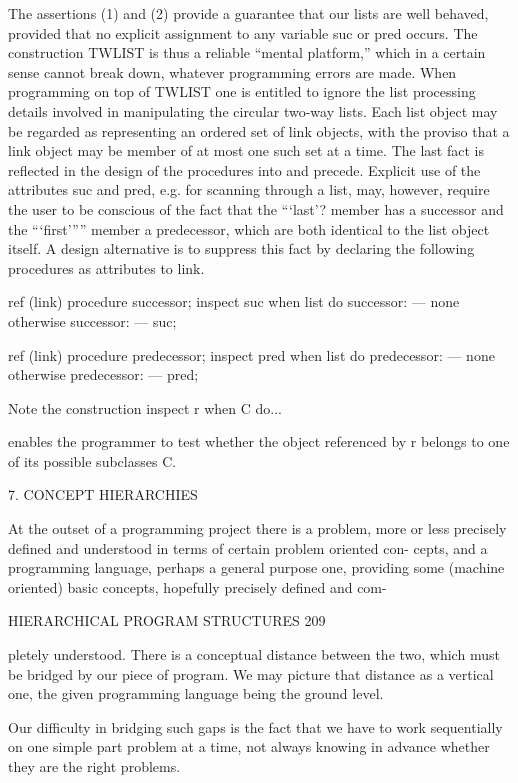 {{{{{		The assertions (1) and (2) provide a guarantee that our lists are well behaved, provided that no explicit assignment to any variable suc or pred occurs. The construction TWLIST is thus a reliable “mental platform,” which in a certain sense cannot break down, whatever programming errors are made. When programming on top of TWLIST one is entitled to ignore the list processing details involved in manipulating the circular two-way lists. Each list object may be regarded as representing an ordered set of link objects, with the proviso that a link object may be member of at most one such set at a time. The last fact is reflected in the design of the procedures into and precede. Explicit use of the attributes suc and pred, e.g. for scanning through a list, may, however, require the user to be conscious of the fact that the “‘last’? member has a successor and the “‘first’”” member a predecessor, which are both identical to the list object itself. A design alternative is to suppress this fact by declaring the following procedures as attributes to link.
		
		ref (link) procedure successor; inspect suc when list do successor: — none otherwise successor: — suc;
		
		ref (link) procedure predecessor; inspect pred when list do predecessor: — none otherwise predecessor: — pred;
		
		Note the construction inspect r when C do...
		
		enables the programmer to test whether the object referenced by r belongs to one of its possible subclasses C.
		
		7. CONCEPT HIERARCHIES
		
		At the outset of a programming project there is a problem, more or less precisely defined and understood in terms of certain problem oriented con- cepts, and a programming language, perhaps a general purpose one, providing some (machine oriented) basic concepts, hopefully precisely defined and com-
		
		HIERARCHICAL PROGRAM STRUCTURES 209
		
		pletely understood. There is a conceptual distance between the two, which must be bridged by our piece of program. We may picture that distance as a vertical one, the given programming language being the ground level.
		
		Our difficulty in bridging such gaps is the fact that we have to work sequentially on one simple part problem at a time, not always knowing in advance whether they are the right problems.
		
}}}}}
